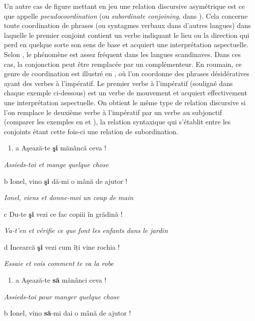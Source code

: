 Un autre cas de figure mettant en jeu une relation discursive asymétrique est ce que \citet{Johannessen1998} appelle\textit{ pseudocoordination} (ou \textit{subordinate conjoining}, dans \citet{Lang1984}). Cela concerne toute coordination de phrases (ou syntagmes verbaux dans d'autres langues) dans laquelle le premier conjoint contient un verbe indiquant le lieu ou la direction qui perd en quelque sorte son sens de base et acquiert une interprétation aspectuelle. Selon \citet[48]{Johannessen1998}, le phénomène est assez fréquent dans les langues scandinaves. Dans ces cas, la conjonction peut être remplacée par un complémenteur. En roumain, ce genre de coordination est illustré en , où l'on coordonne des phrases désidératives ayant des verbes à l'impératif. Le premier verbe à l'impératif (souligné dans chaque exemple ci-dessous) est un verbe de mouvement et acquiert effectivement une interprétation aspectuelle. On obtient le même type de relation discursive si l'on remplace le deuxième verbe à l'impératif par un verbe au subjonctif (comparer les exemples en  et ), la relation syntaxique qui s'établit entre les conjoints étant cette fois-ci une relation de subordination. 


\begin{enumerate}
\item \label{bkm:Ref300785138}a  Aşează-te \textbf{şi} mănâncă ceva !


\end{enumerate}
{\itshape
Assieds-toi et mange quelque chose}

  b  Ionel, vino \textbf{şi} dă-mi o mână de ajutor !

{\itshape
Ionel, viens et donne-moi un coup de main}

  c  Du-te \textbf{şi} vezi ce fac copiii în grădină !

{\itshape
Va-t'en et vérifie ce que font les enfants dans le jardin}

  d  Incearcă \textbf{şi} vezi cum îți vine rochia !

{\itshape
Essaie et vois comment te va la robe}


\begin{enumerate}
\item \label{bkm:Ref300785895}a  Aşează-te \textbf{să} mănânci ceva !


\end{enumerate}
{\itshape
Assieds-toi pour manger quelque chose}

  b  Ionel, vino \textbf{să}-mi dai o mână de ajutor !

